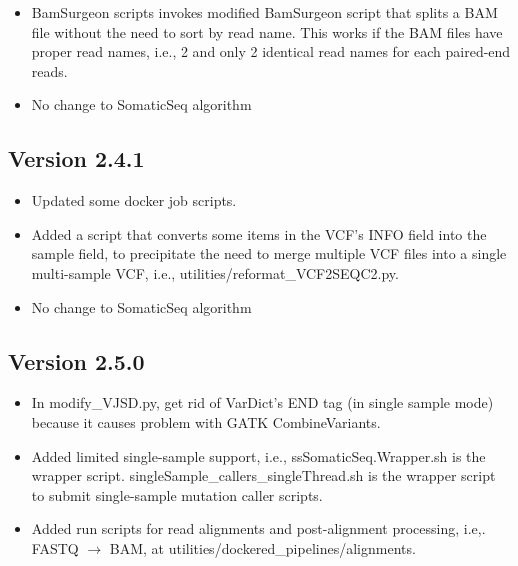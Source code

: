 \documentclass[10pt,letterpaper]{article}
\begin{document}
\begin{sloppypar}
\begin{itemize}
  \item
  BamSurgeon scripts invokes modified BamSurgeon script that splits a BAM file without the need to sort by read name. This works if the BAM files have proper read names, i.e., 2 and only 2 identical read names for each paired-end reads.
  
  \item
  No change to SomaticSeq algorithm

\end{itemize}



\subsection{Version 2.4.1}

\begin{itemize}

  \item
  Updated some docker job scripts.
  
  \item
  Added a script that converts some items in the VCF's INFO field into the sample field, to precipitate the need to merge multiple VCF files into a single multi-sample VCF, i.e., utilities/reformat\_VCF2SEQC2.py.
  
  \item
  No change to SomaticSeq algorithm

\end{itemize}




\subsection{Version 2.5.0}

\begin{itemize}

  \item
  In modify\_VJSD.py, get rid of VarDict's END tag (in single sample mode) because it causes problem with GATK CombineVariants. 
  
  \item
  Added limited single-sample support, i.e., ssSomaticSeq.Wrapper.sh is the wrapper script. singleSample\_callers\_singleThread.sh is the wrapper script to submit single-sample mutation caller scripts.
  
  \item
  Added run scripts for read alignments and post-alignment processing, i.e,. FASTQ $\rightarrow$ BAM, at utilities/dockered\_pipelines/alignments.
  

\end{itemize}
\end{sloppypar}
\end{document}
